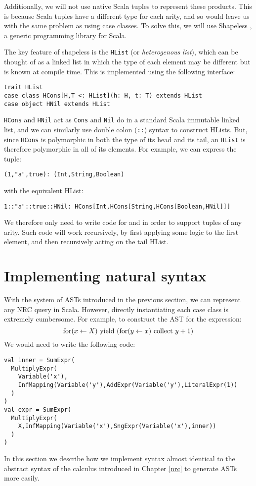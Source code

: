 Additionally, we will not use native Scala tuples to represent these products. This is because Scala tuples have a different type for each arity, and so would leave us with the same problem as using case classes. To solve this, we will use Shapeless \cite{shapeless}, a generic programming library for Scala.

The key feature of shapeless is the \lstinline{HList} (or \textit{heterogenous list}), which can be thought of as a linked list in which the type of each element may be different but is known at compile time. This is implemented using the following interface:
\vs\begin{lstlisting}
trait HList
case class HCons[H,T <: HList](h: H, t: T) extends HList
case object HNil extends HList
\end{lstlisting}\vs
\lstinline{HCons} and \lstinline{HNil} act as \lstinline{Cons} and \lstinline{Nil} do in a standard Scala immutable linked list, and we can similarly use double colon (\lstinline{::}) syntax to construct HLists. But, since \lstinline{HCons} is polymorphic in both the type of its head and its tail, an \lstinline{HList} is therefore polymorphic in all of its elements. For example, we can express the tuple:
\begin{lstlisting}
(1,"a",true): (Int,String,Boolean)
\end{lstlisting}
with the equivalent HList:
\begin{lstlisting}
1::"a"::true::HNil: HCons[Int,HCons[String,HCons[Boolean,HNil]]]
\end{lstlisting}
We therefore only need to write code for  and  in order to support tuples of any arity. Such code will work recursively, by first applying some logic to the first element, and then recursively acting on the tail HList.

\section{Implementing natural syntax}
With the system of ASTs introduced in the previous section, we can represent any NRC query in Scala. However, directly instantiating each case class is extremely cumbersome. For example, to construct the AST for the expression: 
\begin{equation*}
\textrm{for}(x \leftarrow X) \textrm{ yield } (\textrm{for}(y \leftarrow x) \textrm{ collect } y+1)
\end{equation*}
We would need to write the following code:
\vs\begin{lstlisting}
val inner = SumExpr(
  MultiplyExpr(
    Variable('x'),
    InfMapping(Variable('y'),AddExpr(Variable('y'),LiteralExpr(1))
  )
)
val expr = SumExpr(
  MultiplyExpr(
    X,InfMapping(Variable('x'),SngExpr(Variable('x'),inner))
  )
)
\end{lstlisting}\vs
In this section we describe how we implement syntax almost identical to the abstract syntax of the calculus introduced in Chapter \ref{nrc} to generate ASTs more easily.

